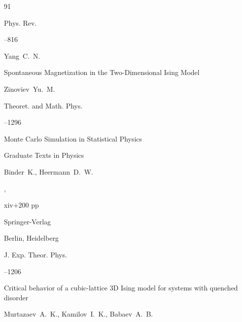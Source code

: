 \begin{thebibliography}{91}

\jour Phys. Rev. 



--816

\by Yang~C.~N.





\paper Spontaneous Magnetization in the Two-Dimensional Ising Model

\by  Zinoviev~Yu.~M.

\jour Theoret. and Math. Phys.




--1296






\book Monte Carlo Simulation in Statistical Physics

\serial Graduate Texts in Physics

\by Binder~K., Heermann~D.~W.


, 


xiv+200 pp

\publ Springer-Verlag 

\publaddr Berlin, Heidelberg 




\jour J. Exp. Theor. Phys.




--1206

\paper Critical behavior of a cubic-lattice 3D Ising model for systems with quenched disorder

\by  Murtazaev~A.~K., Kamilov~I.~K.,  Babaev~A.~B.





\end{thebibliography}
